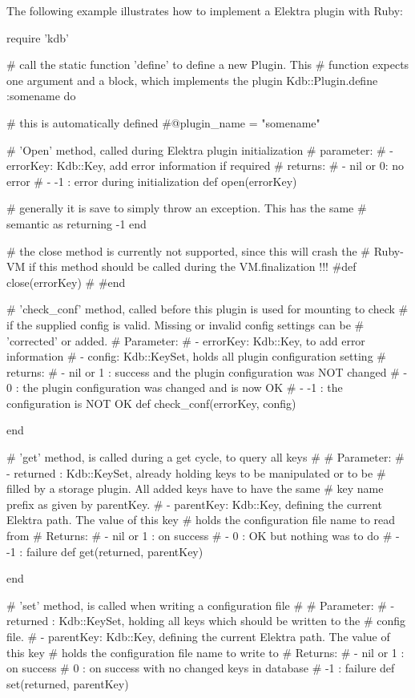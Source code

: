 The following example illustrates how to implement a Elektra plugin with Ruby\+:


\begin{DoxyCode}
require 'kdb'

# call the static function 'define' to define a new Plugin. This
# function expects one argument and a block, which implements the plugin
Kdb::Plugin.define :somename do

  # this is automatically defined
  #@plugin\_name = "somename"


  # 'Open' method, called during Elektra plugin initialization
  # parameter:
  #  - errorKey: Kdb::Key, add error information if required
  # returns:
  #  - nil or 0: no error
  #  - -1      : error during initialization
  def open(errorKey)

    # generally it is save to simply throw an exception. This has the same
    # semantic as returning -1
  end

  # the close method is currently not supported, since this will crash the
  # Ruby-VM if this method should be called during the VM.finalization !!!
  #def close(errorKey)
  #
  #end


  # 'check\_conf' method, called before this plugin is used for mounting to check
  # if the supplied config is valid. Missing or invalid config settings can be
  # 'corrected' or added.
  # Parameter:
  #  - errorKey: Kdb::Key, to add error information
  #  - config: Kdb::KeySet, holds all plugin configuration setting
  # returns:
  #  - nil or 1 : success and the plugin configuration was NOT changed
  #  -        0 : the plugin configuration was changed and is now OK
  #  -       -1 : the configuration is NOT OK
  def check\_conf(errorKey, config)

  end


  # 'get' method, is called during a get cycle, to query all keys
  #
  # Parameter:
  #  - returned : Kdb::KeySet, already holding keys to be manipulated or to be
  #               filled by a storage plugin. All added keys have to have the same
  #               key name prefix as given by parentKey.
  #  - parentKey: Kdb::Key, defining the current Elektra path. The value of this key
  #               holds the configuration file name to read from
  # Returns:
  #  - nil or 1 : on success
  #  -        0 : OK but nothing was to do
  #  -       -1 : failure
  def get(returned, parentKey)

  end


  # 'set' method, is called when writing a configuration file
  #
  # Parameter:
  #  - returned : Kdb::KeySet, holding all keys which should be written to the
  #               config file.
  #  - parentKey: Kdb::Key, defining the current Elektra path. The value of this key
  #               holds the configuration file name to write to
  # Returns:
  #  - nil or 1 : on success
  #           0 : on success with no changed keys in database
  #          -1 : failure
  def set(returned, parentKey)


\end{DoxyCode}

